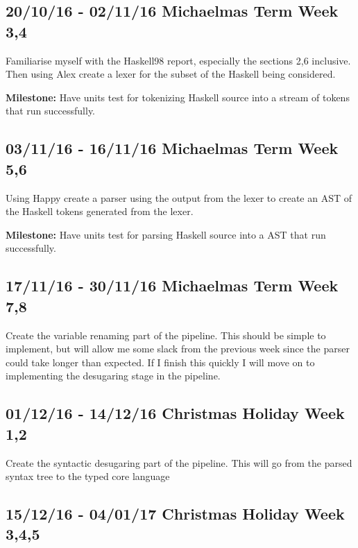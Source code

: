 \documentclass[a4paper]{article}
\begin{document}
    \subsection*{20/10/16 - 02/11/16 \hfill Michaelmas Term Week 3,4}

      Familiarise myself with the Haskell98 report, especially the sections 2,6 inclusive.
      Then using Alex create a lexer for the subset of the Haskell being considered.


      \textbf{Milestone:} Have units test for tokenizing Haskell source into a stream of tokens that run successfully.


    \subsection*{03/11/16 - 16/11/16 \hfill Michaelmas Term Week 5,6}

      Using Happy create a parser using the output from the lexer to create an AST of the Haskell tokens generated from the lexer.

      \textbf{Milestone:} Have units test for parsing Haskell source into a AST that run successfully.



    \subsection*{17/11/16 - 30/11/16 \hfill Michaelmas Term  Week 7,8}

      Create the variable renaming part of the pipeline. This should be simple to implement, but will allow me some slack from the previous week since 
      the parser could take longer than expected. If I finish this quickly I will move on to implementing the desugaring stage in the pipeline.


    \subsection*{01/12/16 - 14/12/16 \hfill Christmas Holiday Week 1,2}

      Create the syntactic desugaring part of the pipeline. This will go from the parsed syntax tree to the typed core language 

    \subsection*{15/12/16 - 04/01/17 \hfill Christmas Holiday Week  3,4,5}
\end{document}
